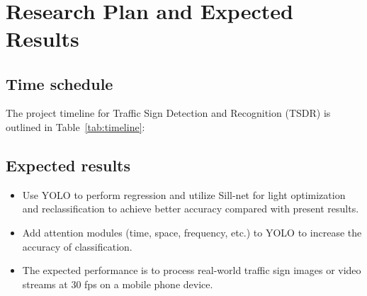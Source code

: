 \documentclass[letterpaper, 10 pt, conference]{ieeeconf}
\begin{document}
\
\section{Research Plan and Expected Results}
\hrulefill

\subsection{Time schedule}

The project timeline for Traffic Sign Detection and Recognition (TSDR) is outlined in Table~\ref{tab:timeline}:

\subsection{Expected results}

\begin{itemize}
    \item Use YOLO to perform regression and utilize Sill-net for light optimization and reclassification to achieve better accuracy compared with present results.
    \item Add attention modules (time, space, frequency, etc.) to YOLO to increase the accuracy of classification.
    \item The expected performance is to process real-world traffic sign images or video streams at 30 fps on a mobile phone device.
\end{itemize}
\end{document}
